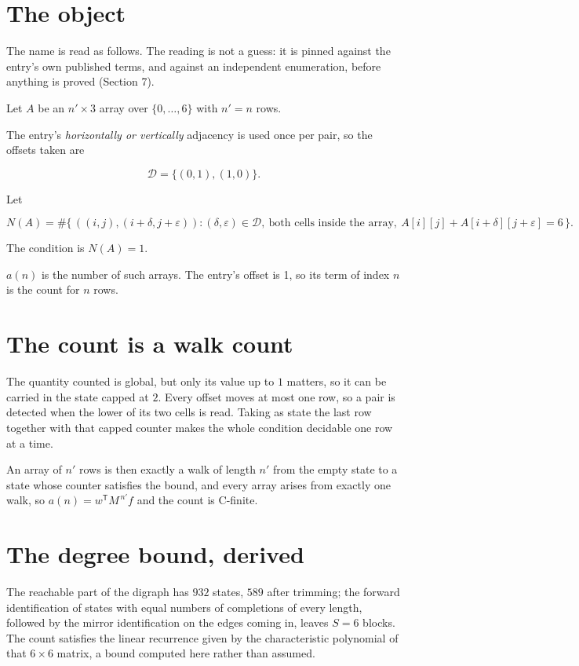 \documentclass[11pt]{article}
\theoremstyle{definition}
\begin{document}
\section{The object}

The name is read as follows. The reading is not a guess: it is pinned against the entry's own published terms, and against an independent enumeration, before anything is proved (Section 7).

Let $A$ be an $n' \times 3$ array over $\{0,\dots,6\}$ with $n' = n$ rows.

The entry's {\itshape horizontally or vertically} adjacency is used once per pair, so the offsets taken are

\[\mathcal{D} = \{(0,1), (1,0)\}.\]

Let

\[N(A) = \#\bigl\{\,((i,j),(i{+}\delta,j{+}\varepsilon)) : (\delta,\varepsilon) \in \mathcal{D},\ \text{both cells inside the array},\ A[i][j] + A[i{+}\delta][j{+}\varepsilon] = 6\,\bigr\}.\]

The condition is $N(A) = 1$.

$a(n)$ is the number of such arrays. The entry's offset is 1, so its term of index $n$ is the count for $n$ rows.

\section{The count is a walk count}

The quantity counted is global, but only its value up to $1$ matters, so it can be carried in the state capped at $2$. Every offset moves at most one row, so a pair is detected when the lower of its two cells is read. Taking as state the last row together with that capped counter makes the whole condition decidable one row at a time.

An array of $n'$ rows is then exactly a walk of length $n'$ from the empty state to a state whose counter satisfies the bound, and every array arises from exactly one walk, so $a(n) = w^{\mathsf T}M^{\,n'}f$ and the count is C-finite.

\section{The degree bound, derived}

The reachable part of the digraph has $932$ states, $589$ after trimming; the forward identification of states with equal numbers of completions of every length, followed by the mirror identification on the edges coming in, leaves $S = 6$ blocks. The count satisfies the linear recurrence given by the characteristic polynomial of that $6\times6$ matrix, a bound computed here rather than assumed.
\end{document}
